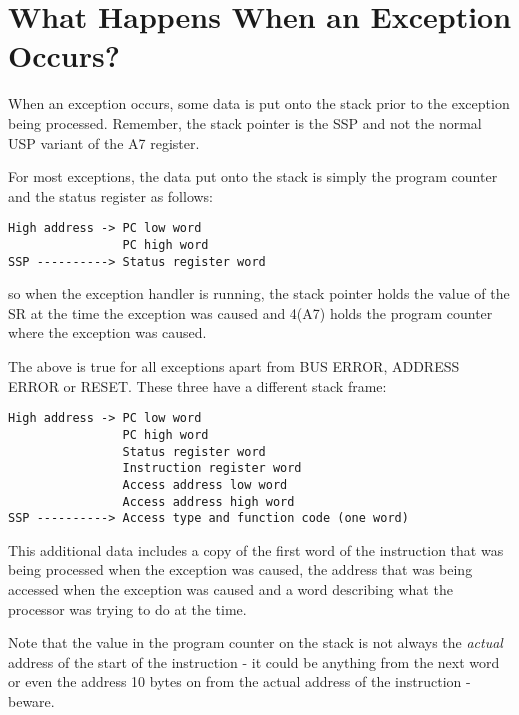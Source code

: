 \section{What Happens When an Exception Occurs?}
\label{ch6-exception-processing}%

When an exception occurs, some data is put onto the stack prior to
    the exception being processed. Remember, the stack pointer is the SSP and
    not the normal USP variant of the A7 register.

For most exceptions, the data put onto the stack is simply the
    program counter and the status register as follows:

\begin{lstlisting}[firstnumber=1,frame=none,numbers=none,language={}]
High address -> PC low word 
                PC high word 
SSP ----------> Status register word
\end{lstlisting}

so when the exception handler is running, the stack pointer holds
    the value of the SR at the time the exception was caused and 4(A7) holds
    the program counter where the exception was caused.

The above is true for all exceptions apart from BUS ERROR, ADDRESS
    ERROR or RESET. These three have a different stack frame:

\begin{lstlisting}[firstnumber=1,frame=none,numbers=none,language={}]
High address -> PC low word 
                PC high word 
                Status register word 
                Instruction register word 
                Access address low word 
                Access address high word 
SSP ----------> Access type and function code (one word)
\end{lstlisting}

This additional data includes a copy of the first word of the
    instruction that was being processed when the exception was caused, the
    address that was being accessed when the exception was caused and a word
    describing what the processor was trying to do at the time.

\begin{warning}
Note that the value in the program counter on the stack is not
      always the \emph{actual} address of the start of the
      instruction -{} it could be anything from the next word or even the
      address 10 bytes on from the actual address of the instruction -{}
      beware.
\end{warning}

